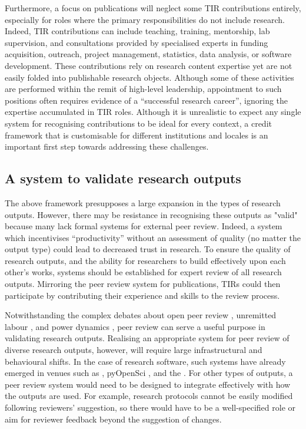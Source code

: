 \documentclass[authordate,meta,issue]{jote-new-article}
\begin{document}
Furthermore, a focus on publications will neglect some TIR contributions entirely, especially for roles where the primary responsibilities do not include research. Indeed, TIR contributions can include teaching, training, mentorship, lab supervision, and consultations provided by specialised experts in funding acquisition, outreach, project management, statistics, data analysis, or software development. These contributions rely on research content expertise yet are not easily folded into publishable research objects. Although some of these activities are performed within the remit of high-level leadership, appointment to such positions often requires evidence of a “successful research career”, ignoring the expertise accumulated in TIR roles. Although it is unrealistic to expect any single system for recognising contributions to be ideal for every context, a credit framework that is customisable for different institutions and locales is an important first step towards addressing these challenges.



\subsection{A system to validate research outputs}



The above framework presupposes a large expansion in the types of research outputs. However, there may be resistance in recognising these outputs as "valid" because many lack formal systems for external peer review. Indeed, a system which incentivises “productivity” without an assessment of quality (no matter the output type) could lead to decreased trust in research. To ensure the quality of research outputs, and the ability for researchers to build effectively upon each other's works, systems should be established for expert review of all research outputs. Mirroring the peer review system for publications, TIRs could then participate by contributing their experience and skills to the review process.



Notwithstanding the complex debates about open peer review \parencites{Heesen2021}{Ross-Hellauer2017}, unremitted labour \parencites{Aczel2021}, and power dynamics \parencites{Huber2022}, peer review can serve a useful purpose in validating research outputs. Realising an appropriate system for peer review of diverse research outputs, however, will require large infrastructural and behavioural shifts. In the case of research software, such systems have already emerged in venues such as \textcites{Ropensci2022}, pyOpenSci \parencites{Holdgraf2022}, and the \textcites{JournalofOpenSourceSoftware2022}. For other types of outputs, a peer review system would need to be designed to integrate effectively with how the outputs are used. For example, research protocols cannot be easily modified following reviewers' suggestion, so there would have to be a well-specified role or aim for reviewer feedback beyond the suggestion of changes.
\end{document}
